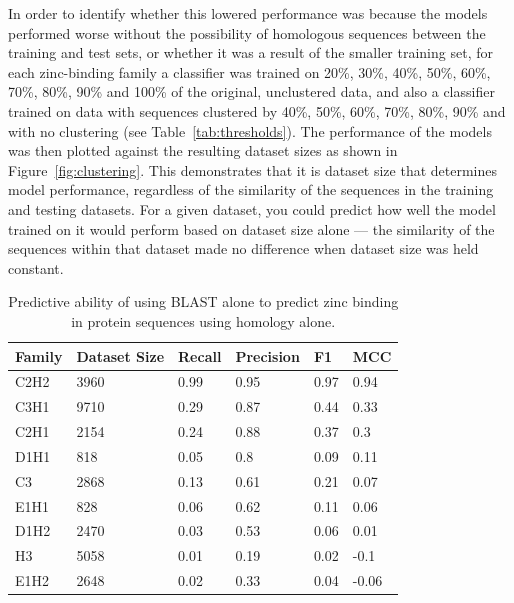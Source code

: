 In order to identify whether this lowered performance was because the models performed worse without the possibility of homologous sequences between the training and test sets, or whether it was a result of the smaller training set,
for each zinc-binding family a classifier was trained on 20\%, 30\%, 40\%, 50\%, 60\%, 70\%, 80\%, 90\% and 100\% of the
original, unclustered data, and also a classifier trained on data with sequences clustered by 40\%, 50\%, 60\%, 70\%, 80\%, 90\% and with no clustering (see Table~\ref{tab:thresholds}). The performance of the models was then plotted against the resulting dataset sizes as shown in Figure~\ref{fig:clustering}.  This demonstrates that it is dataset size that determines model performance, regardless of the similarity of the sequences in the training and testing datasets. For a given dataset, you could predict how well the model trained on it would perform based on dataset size alone --- the similarity of the sequences within that dataset made no difference when dataset size was held constant.

\begin{table}
  \caption{\label{tab:psiblast}Predictive ability of using BLAST alone
    to predict zinc binding in protein sequences using homology
    alone.}
\begin{center}
\begin{tabular}{llllll} \hline
Family & Dataset Size & Recall & Precision & F1    &  MCC  \\ \hline
C2H2   & 3960         & 0.99   & 0.95      & 0.97  &  0.94 \\
C3H1   & 9710         & 0.29   & 0.87      & 0.44  &  0.33 \\
C2H1   & 2154         & 0.24   & 0.88      & 0.37  &  0.3  \\
D1H1   & 818          & 0.05   & 0.8       & 0.09  &  0.11 \\
C3     & 2868         & 0.13   & 0.61      & 0.21  &  0.07 \\ 
E1H1   & 828          & 0.06   & 0.62      & 0.11  &  0.06 \\
D1H2   & 2470         & 0.03   & 0.53      & 0.06  &  0.01 \\
H3     & 5058         & 0.01   & 0.19      & 0.02  & -0.1  \\
E1H2   & 2648         & 0.02   & 0.33      & 0.04  & -0.06 \\ \hline
\end{tabular}
\end{center}
\end{table}

